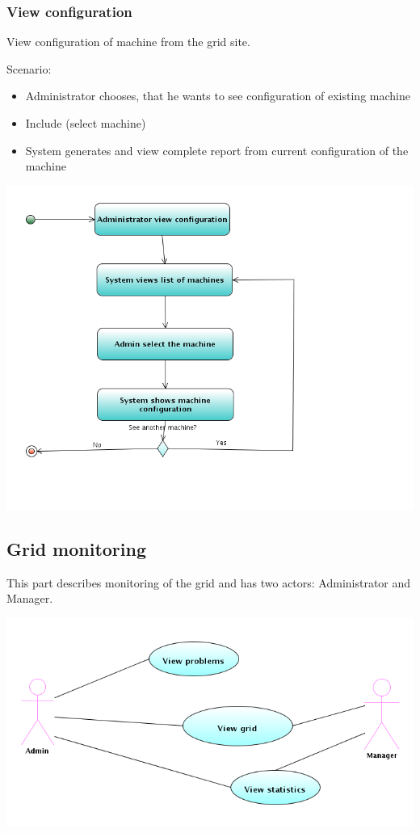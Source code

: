 \documentclass[12pt]{article}
\begin{document}
\subsubsection{View configuration}
View configuration of machine from the grid site.

Scenario:
\begin{itemize}
\item{Administrator chooses, that he wants to see configuration of existing machine}
\item{Include (select machine)}
\item{System generates and view complete report from current configuration of the machine}
\end{itemize}

\includegraphics[width=\linewidth]{ViewConf.png}


\subsection{Grid monitoring}
This part describes monitoring of the grid and has two actors: Administrator and Manager.

\includegraphics[width=\linewidth]{grid_monitoring.png}
\end{document}
